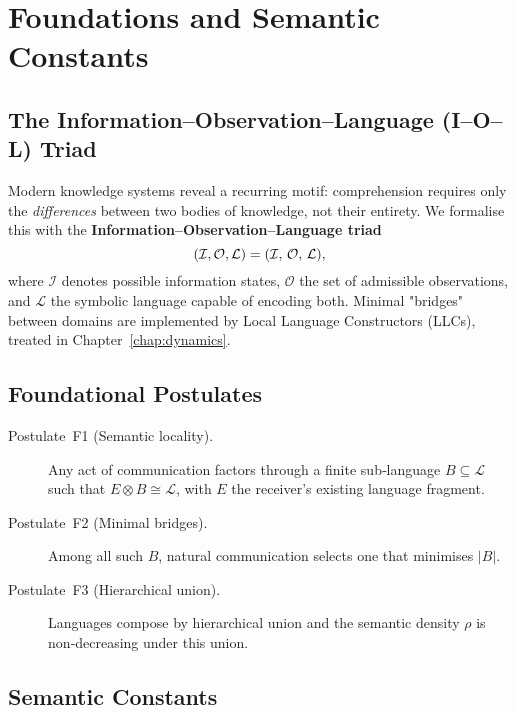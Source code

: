 
\chapter{Foundations and Semantic Constants}\label{chap:foundations}

\section{The Information--Observation--Language (I--O--L) Triad}\label{sec:IOL-triad}

Modern knowledge systems reveal a recurring motif: comprehension requires only the
\emph{differences} between two bodies of knowledge, not their entirety.  We formalise this
with the \textbf{Information--Observation--Language triad}
\begin{equation}
  (\mathcal I,\mathcal O,\mathcal L) = (\mathcal I,\, \mathcal O,\, \mathcal L),
\end{equation}
where $\mathcal I$ denotes possible information states, $\mathcal O$ the set of admissible
observations, and $\mathcal L$ the symbolic language capable of encoding both.  Minimal
"bridges" between domains are implemented by Local Language Constructors (LLCs), treated
in Chapter~\ref{chap:dynamics}.

\section{Foundational Postulates}\label{sec:axioms}

\begin{description}
  \item[Postulate F1 (Semantic locality).]  Any act of communication factors through a
  finite sub‑language $B\subseteq \mathcal L$ such that $E\otimes B\cong \mathcal L$, with
  $E$ the receiver's existing language fragment.

  \item[Postulate F2 (Minimal bridges).]  Among all such $B$, natural communication
  selects one that minimises $|B|$.

  \item[Postulate F3 (Hierarchical union).]  Languages compose by hierarchical union and
  the semantic density $\rho$ is non‑decreasing under this union.
\end{description}

\section{Semantic Constants}\label{sec:constants}

